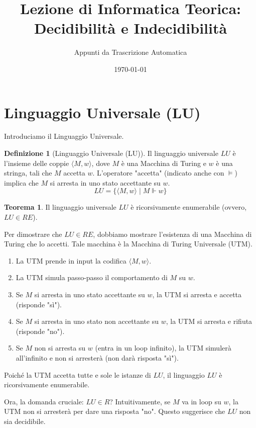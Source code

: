\documentclass[a4paper]{article}
\title{Lezione di Informatica Teorica: Decidibilità e Indecidibilità}
\author{Appunti da Trascrizione Automatica}
\date{\today}
\makeatletter
\theoremstyle{definition} %
\newtheorem{theorem}{Teorema}
[section] %
\newtheorem{definition}{Definizione}[section] %
\renewenvironment{proof}[1][\proofname]{\par
  \pushQED{\qed}%
  \normalfont \topsep6\p@\@plus6\p@\relax
  \trivlist
  \item[\hskip\labelsep
        \bfseries
    #1\@addpunct{.}]\ignorespaces
}{%
  \popQED\endtrivlist\@endpefalse
}
\makeatother
\begin{document}
\maketitle
\tableofcontents
\newpage

\section{Linguaggio Universale (LU)}

Introduciamo il Linguaggio Universale.
\begin{definition}[Linguaggio Universale (LU)]
Il linguaggio universale $LU$ è l'insieme delle coppie $\langle M, w \rangle$, dove $M$ è una Macchina di Turing e $w$ è una stringa, tali che $M$ accetta $w$. L'operatore "accetta" (indicato anche con $\models$) implica che $M$ si arresta in uno stato accettante su $w$.
\[ LU = \{ \langle M, w \rangle \mid M \Vdash w \} \]
\end{definition}

\begin{theorem}
Il linguaggio universale $LU$ è ricorsivamente enumerabile (ovvero, $LU \in RE$).
\end{theorem}
\begin{proof}
Per dimostrare che $LU \in RE$, dobbiamo mostrare l'esistenza di una Macchina di Turing che lo accetti. Tale macchina è la Macchina di Turing Universale (UTM).
\begin{enumerate}
    \item La UTM prende in input la codifica $\langle M, w \rangle$.
    \item La UTM simula passo-passo il comportamento di $M$ su $w$.
    \item Se $M$ si arresta in uno stato accettante su $w$, la UTM si arresta e accetta (risponde "sì").
    \item Se $M$ si arresta in uno stato non accettante su $w$, la UTM si arresta e rifiuta (risponde "no").
    \item Se $M$ non si arresta su $w$ (entra in un loop infinito), la UTM simulerà all'infinito e non si arresterà (non darà risposta "sì").
\end{enumerate}
Poiché la UTM accetta tutte e sole le istanze di $LU$, il linguaggio $LU$ è ricorsivamente enumerabile.
\end{proof}

Ora, la domanda cruciale: $LU \in R$? Intuitivamente, se $M$ va in loop su $w$, la UTM non si arresterà per dare una risposta "no". Questo suggerisce che $LU$ non sia decidibile.
\end{document}

